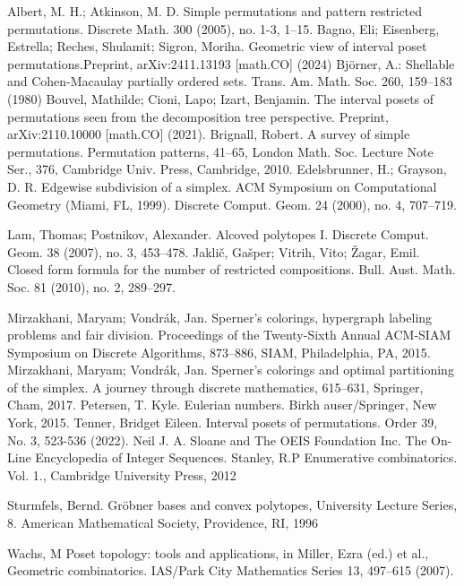 \documentclass{birkjour}
\theoremstyle{definition}
\theoremstyle{remark}
\numberwithin{equation}{section}
\begin{document}
\begin{thebibliography}{}
 Albert, M. H.; Atkinson, M. D.
 Simple permutations and pattern restricted permutations.
  Discrete Math. 300 (2005), no. 1-3, 1--15.
 Bagno, Eli; Eisenberg, Estrella;
Reches, Shulamit; Sigron, Moriha. Geometric view of interval poset
permutations.Preprint, arXiv:2411.13193 [math.CO] (2024)
 Bj\" {o}rner, A.:
Shellable and Cohen-Macaulay partially ordered sets. Trans. Am.
Math. Soc. 260, 159--183 (1980)
 Bouvel, Mathilde; Cioni, Lapo; Izart, Benjamin.
The interval posets of permutations seen from the decomposition
tree perspective. Preprint, arXiv:2110.10000 [math.CO] (2021).
 Brignall, Robert. A survey of simple permutations.
Permutation patterns, 41--65, London Math.
Soc. Lecture Note Ser., 376, Cambridge Univ. Press, Cambridge, 2010.
Edelsbrunner, H.; Grayson, D. R. Edgewise subdivision of a
simplex. ACM Symposium on Computational Geometry (Miami, FL,
1999). Discrete Comput. Geom. 24 (2000), no. 4, 707--719.

 Lam, Thomas; Postnikov, Alexander.
Alcoved polytopes I. Discrete Comput. Geom. 38 (2007), no. 3,
453--478.
 Jakli\v c, Ga\v sper; Vitrih, Vito; \v Zagar, Emil.
 Closed form formula for the number of
restricted compositions. Bull. Aust. Math. Soc. 81 (2010),
no. 2, 289--297.


Mirzakhani, Maryam; Vondr\' ak, Jan.
Sperner's colorings, hypergraph labeling problems and fair
division.
 Proceedings of the Twenty-Sixth Annual
 ACM-SIAM Symposium on Discrete Algorithms,
873--886, SIAM, Philadelphia, PA, 2015.
 Mirzakhani, Maryam; Vondr\' ak, Jan.
Sperner's colorings and optimal partitioning of the simplex. A
journey through discrete mathematics, 615--631, Springer, Cham,
2017.
 Petersen, T. Kyle. Eulerian numbers.
Birkh\: auser/Springer, New York, 2015.
 Tenner, Bridget Eileen. Interval posets of permutations.
Order 39, No. 3, 523-536 (2022).
 Neil J. A. Sloane and The OEIS Foundation Inc.
 The On-Line Encyclopedia of Integer Sequences.
 Stanley, R.P Enumerative combinatorics. Vol.
1., Cambridge University Press, 2012

 Sturmfels, Bernd. Gr\" obner bases and convex
polytopes, University
Lecture Series, 8. American Mathematical Society, Providence, RI, 1996

 Wachs, M Poset topology: tools and applications,
in Miller, Ezra (ed.) et al., Geometric combinatorics.  IAS/Park
City Mathematics Series 13, 497--615 (2007).
\end{thebibliography}
\end{document}
